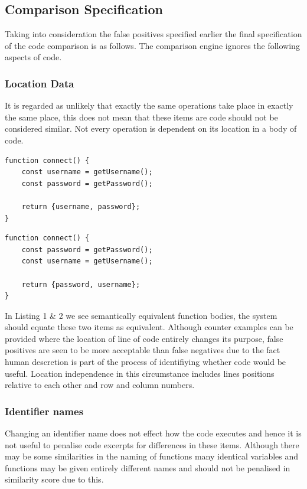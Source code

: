 \documentclass[jou,apacite]{apa6}
\begin{document}
\subsection{Comparison Specification}
Taking into consideration the false positives specified earlier the final specification of the code comparison is as follows. The comparison engine ignores the following aspects of code.

\subsubsection{Location Data}
It is regarded as unlikely that exactly the same operations take place in exactly the same place, this does not mean that these items are code should not be considered similar. Not every operation is dependent on its location in a body of code.

\begin{lstlisting}[caption=Location independent example - A]
function connect() {
	const username = getUsername();
	const password = getPassword();
	
	return {username, password};
}
\end{lstlisting}

\begin{lstlisting}[caption=Location independent example - B]
function connect() {
	const password = getPassword();
	const username = getUsername();
	
	return {password, username};
}
\end{lstlisting}
In Listing 1 \& 2 we see semantically equivalent function bodies, the system should equate these two items as equivalent. Although counter examples can be provided where the location of line of code entirely changes its purpose, false positives are seen to be more acceptable than false negatives due to the fact human descretion is part of the process of identifiying whether code would be useful.
Location independence in this circumstance includes lines positions relative to each other and row and column numbers. 
\subsubsection{Identifier names}
Changing an identifier name does not effect how the code executes and hence it is not useful to penalise code excerpts for differences in these items.
Although there may be some similarities in the naming of functions many identical variables and functions may be given entirely different names and should not be penalised in similarity score due to this.
\end{document}
